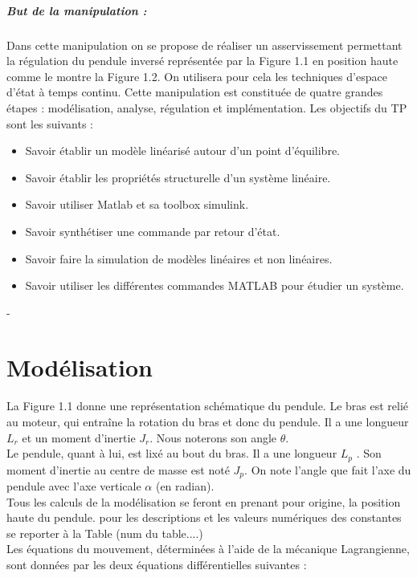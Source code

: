 \documentclass[12pt, a4paper, openany]{report}
\begin{document}
\paragraph{But de la manipulation :}  Dans cette manipulation on se propose de réaliser un asservissement permettant la régulation du pendule inversé représentée par la Figure 1.1 en position haute comme le montre la Figure 1.2. On utilisera pour cela les techniques d'espace d'état à temps continu. Cette manipulation est constituée de quatre grandes étapes : modélisation, analyse, régulation et implémentation. Les objectifs du TP sont les suivants :
\begin{itemize}
\item Savoir établir un modèle linéarisé autour d'un point d'équilibre.
\item Savoir établir les propriétés structurelle d'un système linéaire.
\item Savoir utiliser Matlab et sa toolbox simulink.
\item Savoir synthétiser une commande par retour d'état.
\item Savoir faire la simulation de modèles linéaires et non linéaires.
\item Savoir utiliser les différentes commandes MATLAB pour étudier un système.

\end{itemize}


-
 
    
 \chapter{Modélisation}
 
 La Figure 1.1 donne une représentation schématique du pendule. Le bras est relié au moteur, qui entraîne la rotation du bras et donc du pendule. Il a une longueur $L_{r}$ et un moment d'inertie $J_{r}$. Nous noterons son angle $\theta$.\\
 Le pendule, quant à lui, est lixé au bout du bras. Il a une longueur $L_{p}$ . Son moment d'inertie au
centre de masse est noté $J_{p}$. On note l'angle que fait l'axe du pendule avec l'axe verticale $\alpha$ (en radian).\\
 Tous les calculs de la modélisation se feront en prenant pour origine, la position haute du pendule. pour les descriptions et les valeurs numériques des constantes se reporter à la Table (num du table....) \\
 Les équations du mouvement, déterminées à l'aide de la mécanique Lagrangienne, sont données par les
deux équations différentielles suivantes : \\[1cm]\\
\end{document}
